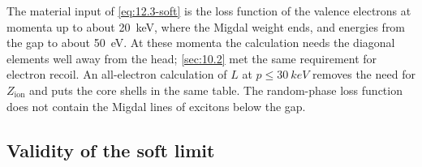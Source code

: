 The material input of \cref{eq:12.3-soft} is the loss function of the valence electrons at momenta up to about \SI{20}{keV}, where the Migdal weight ends, and energies from the gap to about \SI{50}{eV}. At these momenta the calculation needs the diagonal elements well away from the head; \cref{sec:10.2} met the same requirement for electron recoil. An all-electron calculation of $L$ at $p \le \SI{30}{keV}$ removes the need for $Z_{\mathrm{ion}}$ and puts the core shells in the same table. The random-phase loss function does not contain the Migdal lines of excitons below the gap.

\subsection{Validity of the soft limit}\label{sec:12.3-validity}

